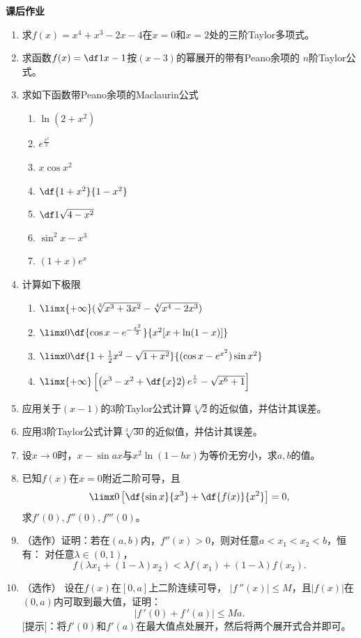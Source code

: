 \begin{ext}
	{\bf 课后作业}
	
	\begin{enumerate}
	  \item 求$f(x)=x^4+x^3-2x-4$在$x=0$和$x=2$处的三阶Taylor多项式。
	  \item 求函数$f(x)=\df1{x-1}$按$(x-3)$的幂展开的带有Peano余项的
	  $n$阶Taylor公式。
	  \item 求如下函数带Peano余项的Maclaurin公式
		\begin{enumerate}[(1)]
		  \item $\ln(2+x^2)$
		  \item $e^{\frac{x^2}2}$
		  \item $x\cos x^2$
		  \item $\df{1+x^2}{1-x^2}$
		  \item $\df1{\sqrt{4-x^2}}$
		  \item $\sin^2x-x^3$
		  \item $(1+x)e^{x}$
		\end{enumerate}
	  \item 计算如下极限
	  \begin{enumerate}[(1)]
		\item $\limx{+\infty}(\sqrt[3]{x^3+3x^2}-\sqrt[4]{x^4-2x^3})$
		\item $\limx0\df{\cos x-e^{-\frac{x^2}2}}{x^2[x+\ln(1-x)]}$
		\item $\limx0\df{1+\frac12x^2-\sqrt{1+x^2}}{(\cos x-e^{x^2})\sin x^2}$
		\item $\limx{+\infty}\left[\left(x^3-x^2+\df{x}2\right)e^{\frac1x}
		-\sqrt{x^6+1}\right]$
	  \end{enumerate}
	  \item 应用关于$(x-1)$的$3$阶Taylor公式计算$\sqrt[3]{2}$的近似值，并估计其误差。
	  \item 应用$3$阶Taylor公式计算$\sqrt[3]{30}$的近似值，并估计其误差。
	  \item 设$x\to 0$时，$x-\sin ax$与$x^2\ln(1-bx)$为等价无穷小，求$a,b$的值。
	  \item 已知$f(x)$在$x=0$附近二阶可导，且
	  $$\limx0\left[\df{\sin x}{x^3}+\df{f(x)}{x^2}\right]=0,$$
	  求$f'(0),f''(0),f'''(0)$。
	  \item （选作）证明：若在$(a,b)$内，$f''(x)>0$，则对任意$a<x_1<x_2<b$，恒有：
	  对任意$\lambda\in(0,1)$，
		$$f(\lambda x_1+(1-\lambda)x_2)<\lambda
		f(x_1)+(1-\lambda)f(x_2).$$
	  \item （选作） 设在$f(x)$在$[0,a]$上二阶连续可导，
		$|f\,''(x)|\leq M$，且$|f(x)|$在$(0,a)$内可取到最大值，证明：
		$$|f\,'(0)+f\,'(a)|\leq Ma.$$		
		[提示]：将$f'(0)$和$f'(a)$在最大值点处展开，然后将两个展开式合并即可。
	\end{enumerate}
\end{ext}

